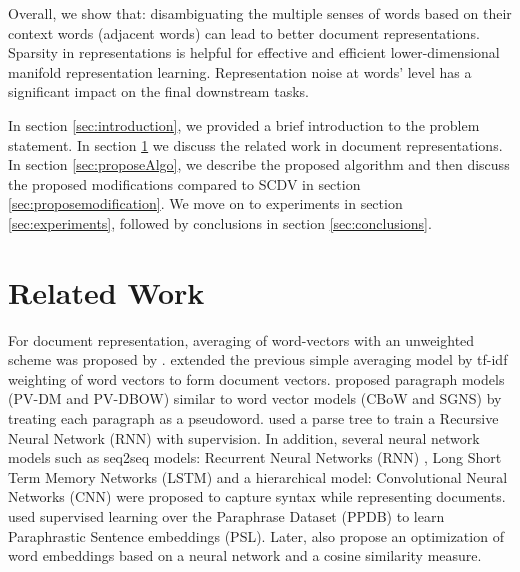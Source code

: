 \documentclass{ecai}
\begin{document}
Overall, we show that: disambiguating the multiple senses of words based on their context words (adjacent words) can lead to better document representations. Sparsity in representations is helpful for effective and efficient lower-dimensional manifold representation learning. Representation noise at words' level has a significant impact on the final downstream tasks. 

\vspace{0.3em}
\noindent In section \ref{sec:introduction}, we provided a brief introduction to the problem statement. In section \ref{sec:relatedwork} we discuss the related work in document representations. In section \ref{sec:proposeAlgo}, we describe the proposed algorithm and then discuss the proposed modifications compared to SCDV in section \ref{sec:proposemodification}. We move on to experiments in section \ref{sec:experiments}, followed by conclusions in section \ref{sec:conclusions}. 

\section{Related Work}
\label{sec:relatedwork}

For document representation, averaging of word-vectors with an unweighted scheme was proposed by \cite{smolensky1990tensor,mitchell-lapata-2008-vector,mitchell2010composition,mikolov2013distributed}. \cite{pranjal2015weighted} extended the previous simple averaging model by tf-idf weighting of word vectors to form document vectors. \cite{le2014distributed} proposed paragraph models (PV-DM and PV-DBOW) similar to word vector models (CBoW and SGNS) by treating each paragraph as a pseudoword. \cite{socher2013recursive} used a parse tree to train a Recursive Neural Network (RNN) with supervision.  In addition, several neural network models such as seq2seq models: Recurrent Neural Networks (RNN) \cite{mikolov2010recurrent}, Long Short Term Memory Networks (LSTM) \cite{gers2002learning} and a hierarchical model: Convolutional Neural Networks (CNN) \cite{kim2014convolutional,kalchbrenner2014convolutional} were proposed to capture syntax while representing documents. \cite{wieting2015paraphrase} used supervised learning over the Paraphrase Dataset (PPDB) to learn Paraphrastic Sentence embeddings (PSL). Later, \cite{wieting2015towards} also propose an optimization of word embeddings based on a neural network and a cosine similarity measure.
\end{document}
